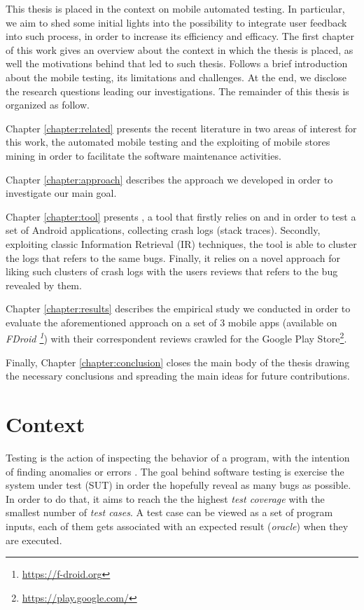\label{chapter:intro}
This thesis is placed in the context on mobile automated testing. In particular, we aim to shed some initial lights into the possibility to integrate user feedback into such process, in order to increase its efficiency and efficacy.
The first chapter of this work gives an overview about the context in which the thesis is placed, as well the motivations behind that led to such thesis. Follows a brief introduction about the mobile testing, its limitations and challenges. At the end, we disclose the research questions leading our investigations. 
The remainder of this thesis is organized as follow. 

Chapter \ref{chapter:related} presents the recent literature in two areas of interest for this work, \ie the automated mobile testing and the exploiting of mobile stores mining in order to facilitate the software maintenance activities.

Chapter \ref{chapter:approach} describes the approach we developed in order to investigate our main goal.

Chapter \ref{chapter:tool} presents \toolname, a tool that firstly relies on \monkey and \sapienz in order to test a set of Android applications, collecting crash logs (\ie stack traces). Secondly, exploiting classic Information Retrieval (IR) techniques, the tool is able to cluster the logs that refers to the same bugs. Finally, it relies on a novel approach for liking such clusters of crash logs with the users reviews that refers to the bug revealed by them. 

Chapter \ref{chapter:results} describes the empirical study we conducted in order to evaluate the aforementioned approach on a set of 3 mobile apps (available on \textit{FDroid \footnote{\url{https://f-droid.org}}}) with their correspondent reviews crawled for the Google Play Store\footnote{\url{https://play.google.com/}}. 

Finally, Chapter \ref{chapter:conclusion} closes the main body of the thesis drawing the necessary conclusions and spreading the main ideas for future contributions.


\section{Context}
Testing is the action of inspecting the behavior of a program, with the intention of finding anomalies or errors \cite{testing}.
The goal behind software testing is exercise the system under test (SUT) in order the hopefully reveal as many bugs as possible. In order to do that, it aims to reach the the highest \textit{test coverage} with the smallest number of \textit{test cases}. A test case can be viewed as a set of program inputs, each of them gets associated with an expected result (\ie \textit{oracle}) when they are executed. 


